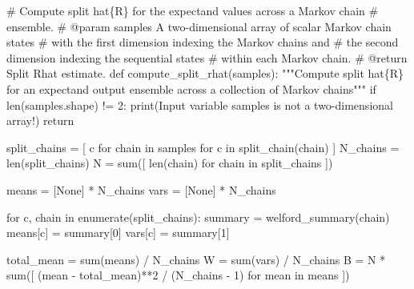 \documentclass[
  letterpaper,
  DIV=11,
  numbers=noendperiod]{scrartcl}
\newenvironment{Shaded}{\begin{snugshade}}{\end{snugshade}}
\newcommand{\BuiltInTok}[1]{\textcolor[rgb]{0.00,0.23,0.31}{#1}}
\newcommand{\CommentTok}[1]{\textcolor[rgb]{0.37,0.37,0.37}{#1}}
\newcommand{\ControlFlowTok}[1]{\textcolor[rgb]{0.00,0.23,0.31}{#1}}
\newcommand{\DecValTok}[1]{\textcolor[rgb]{0.68,0.00,0.00}{#1}}
\newcommand{\KeywordTok}[1]{\textcolor[rgb]{0.00,0.23,0.31}{#1}}
\newcommand{\NormalTok}[1]{\textcolor[rgb]{0.00,0.23,0.31}{#1}}
\newcommand{\OperatorTok}[1]{\textcolor[rgb]{0.37,0.37,0.37}{#1}}
\newcommand{\StringTok}[1]{\textcolor[rgb]{0.13,0.47,0.30}{#1}}
\newcommand{\VariableTok}[1]{\textcolor[rgb]{0.07,0.07,0.07}{#1}}
\begin{document}
\begin{Shaded}
\begin{Highlighting}[]

\CommentTok{\# Compute split hat\{R\} for the expectand values across a Markov chain }
\CommentTok{\# ensemble.}
\CommentTok{\# @param samples A two{-}dimensional array of scalar Markov chain states }
\CommentTok{\#                with the first dimension indexing the Markov chains and }
\CommentTok{\#                the second dimension indexing the sequential states }
\CommentTok{\#                within each Markov chain.}
\CommentTok{\# @return Split Rhat estimate.}
\KeywordTok{def}\NormalTok{ compute\_split\_rhat(samples):}
  \CommentTok{"""Compute split hat\{R\} for an expectand output ensemble across}
\CommentTok{     a collection of Markov chains"""}
  \ControlFlowTok{if} \BuiltInTok{len}\NormalTok{(samples.shape) }\OperatorTok{!=} \DecValTok{2}\NormalTok{:}
    \BuiltInTok{print}\NormalTok{(}\StringTok{\textquotesingle{}Input variable \textasciigrave{}samples\textasciigrave{} is not a two{-}dimensional array!\textquotesingle{}}\NormalTok{)}
    \ControlFlowTok{return}
  
\NormalTok{  split\_chains }\OperatorTok{=}\NormalTok{ [ c }\ControlFlowTok{for}\NormalTok{ chain }\KeywordTok{in}\NormalTok{ samples }\ControlFlowTok{for}\NormalTok{ c }\KeywordTok{in}\NormalTok{ split\_chain(chain) ]}
\NormalTok{  N\_chains }\OperatorTok{=} \BuiltInTok{len}\NormalTok{(split\_chains)}
\NormalTok{  N }\OperatorTok{=} \BuiltInTok{sum}\NormalTok{([ }\BuiltInTok{len}\NormalTok{(chain) }\ControlFlowTok{for}\NormalTok{ chain }\KeywordTok{in}\NormalTok{ split\_chains ])}
  
\NormalTok{  means }\OperatorTok{=}\NormalTok{ [}\VariableTok{None}\NormalTok{] }\OperatorTok{*}\NormalTok{ N\_chains}
  \BuiltInTok{vars} \OperatorTok{=}\NormalTok{ [}\VariableTok{None}\NormalTok{] }\OperatorTok{*}\NormalTok{ N\_chains}
  
  \ControlFlowTok{for}\NormalTok{ c, chain }\KeywordTok{in} \BuiltInTok{enumerate}\NormalTok{(split\_chains):}
\NormalTok{    summary }\OperatorTok{=}\NormalTok{ welford\_summary(chain)}
\NormalTok{    means[c] }\OperatorTok{=}\NormalTok{ summary[}\DecValTok{0}\NormalTok{]}
    \BuiltInTok{vars}\NormalTok{[c] }\OperatorTok{=}\NormalTok{ summary[}\DecValTok{1}\NormalTok{]}
  
\NormalTok{  total\_mean }\OperatorTok{=} \BuiltInTok{sum}\NormalTok{(means) }\OperatorTok{/}\NormalTok{ N\_chains}
\NormalTok{  W }\OperatorTok{=} \BuiltInTok{sum}\NormalTok{(}\BuiltInTok{vars}\NormalTok{) }\OperatorTok{/}\NormalTok{ N\_chains}
\NormalTok{  B }\OperatorTok{=}\NormalTok{ N }\OperatorTok{*} \BuiltInTok{sum}\NormalTok{([ (mean }\OperatorTok{{-}}\NormalTok{ total\_mean)}\OperatorTok{**}\DecValTok{2} \OperatorTok{/}\NormalTok{ (N\_chains }\OperatorTok{{-}} \DecValTok{1}\NormalTok{) }
                \ControlFlowTok{for}\NormalTok{ mean }\KeywordTok{in}\NormalTok{ means ])}
  

\end{Highlighting}
\end{Shaded}
\end{document}
